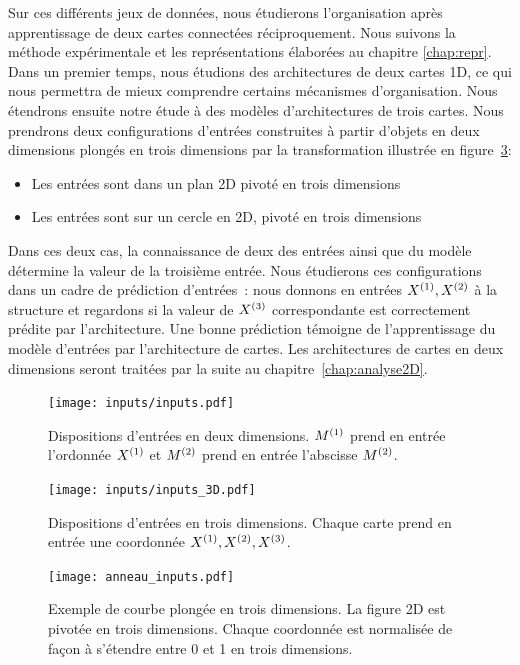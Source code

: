 \documentclass[../main]{subfiles}
\begin{document}
Sur ces différents jeux de données, nous étudierons l'organisation après apprentissage de deux cartes connectées réciproquement. Nous suivons la méthode expérimentale et les représentations élaborées au chapitre \ref{chap:repr}.
Dans un premier temps, nous étudions des architectures de deux cartes 1D, ce qui nous permettra de mieux comprendre certains mécanismes d'organisation.
Nous étendrons ensuite notre étude à des modèles d'architectures de trois cartes. Nous prendrons deux configurations d'entrées construites à partir d'objets en deux dimensions plongés en trois dimensions par la transformation illustrée en figure~\ref{fig:in_3D}: 
\begin{itemize}
	\item Les entrées sont dans un plan 2D pivoté en trois dimensions
	\item Les entrées sont sur un cercle en 2D, pivoté en trois dimensions
\end{itemize}

Dans ces deux cas, la connaissance de deux des entrées ainsi que du modèle détermine la valeur de la troisième entrée. 
Nous étudierons ces configurations dans un cadre de prédiction d'entrées~: nous donnons en entrées $X^{({1})}, X^{({2})}$ à la structure et regardons si la valeur de $X^{({3})}$ correspondante est correctement prédite par l'architecture. 
Une bonne prédiction témoigne de l'apprentissage du modèle d'entrées par l'architecture de cartes.
Les architectures de cartes en deux dimensions seront traitées par la suite au chapitre~\ref{chap:analyse2D}.

\begin{figure}
	\texttt{[image: inputs/inputs.pdf]}
	\caption{Dispositions d'entrées en deux dimensions. $M^{({1})}$ prend en entrée l'ordonnée $X^{({1})}$ et $M^{({2})}$ prend en entrée l'abscisse $M^{({2})}$. \label{fig:input_list}}
\end{figure}

\begin{figure}
	\texttt{[image: inputs/inputs\_3D.pdf]}
	\caption{Dispositions d'entrées en trois dimensions. Chaque carte prend en entrée une coordonnée $X^{({1})}, X^{({2})}, X^{({3})}$. \label{fig:inputs_3D}}
\end{figure}

\begin{figure}
	\centering\texttt{[image: anneau\_inputs.pdf]}
	\caption{Exemple de courbe plongée en trois dimensions. La figure 2D est pivotée en trois dimensions. Chaque coordonnée est normalisée de façon à s'étendre entre 0 et 1 en trois dimensions.
	\label{fig:in_3D}}
\end{figure}
\end{document}
